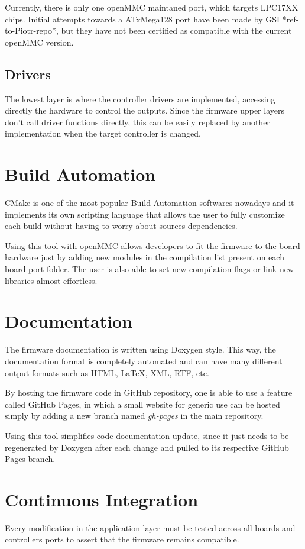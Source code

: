 \documentclass[a4paper,
              ]{jacow}
\begin{document}
Currently, there is only one openMMC maintaned port, which targets LPC17XX chips.
Initial attempts towards a ATxMega128 port have been made by GSI *ref-to-Piotr-repo*, but they have not been certified as compatible with the current openMMC version.

\subsection{Drivers}
The lowest layer is where the controller drivers are implemented, accessing directly the hardware to control the outputs.
Since the firmware upper layers don't call driver functions directly, this can be easily replaced by another implementation when the target controller is changed.

\section{Build Automation}
CMake is one of the most popular Build Automation softwares nowadays and it implements its own scripting language that allows the user to fully customize each build without having to worry about sources dependencies.

Using this tool with openMMC allows developers to fit the firmware to the board hardware just by adding new modules in the compilation list present on each board port folder.
The user is also able to set new compilation flags or link new libraries almost effortless.

\section{Documentation}
The firmware documentation is written using Doxygen style. This way, the documentation format is completely automated and can have many different output formats such as HTML, \LaTeX , XML, RTF, etc.

By hosting the firmware code in GitHub repository, one is able to use a feature called GitHub Pages, in which a small website for generic use can be hosted simply by adding a new branch named \emph{gh-pages} in the main repository.

Using this tool simplifies code documentation update, since it just needs to be regenerated by Doxygen after each change and pulled to its respective GitHub Pages branch.

\section{Continuous Integration}
Every modification in the application layer must be tested across all boards and controllers ports to assert that the firmware remains compatible.
\end{document}
